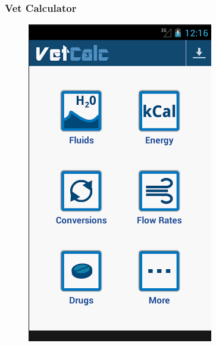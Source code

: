 \documentclass{l3proj}
\begin{document}
\subsubsection{Vet Calculator}

\begin{figure}[!htb]
  \includegraphics[width=\linewidth]{images/VetCalcApp/VetCalcApp1.png}
\endminipage\hfill
{}

\end{figure}
\end{document}
